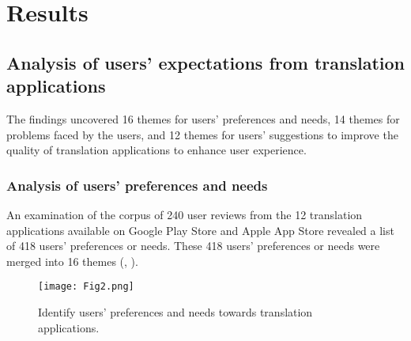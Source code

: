 \documentclass[english]{textolivre}
\begin{document}
\section{Results}\label{sec-resumo}
\subsection{Analysis of users’ expectations from translation applications}
The findings uncovered 16 themes for users’ preferences and needs, 14 themes for problems faced by the users, and 12 themes for users’ suggestions to improve the quality of translation applications to enhance user experience.

\subsubsection{Analysis of users’ preferences and needs}\label{sec-secoes}
An examination of the corpus of 240 user reviews from the 12 translation applications available on Google Play Store and Apple App Store revealed a list of 418 users’ preferences or needs. These 418 users’ preferences or needs were merged into 16 themes (, ).

\begin{figure}[h!]
    \centering
    \texttt{[image: Fig2.png]}
    \caption{Identify users’ preferences and needs towards translation applications.}
    \label{fig2}
\end{figure}
\end{document}
